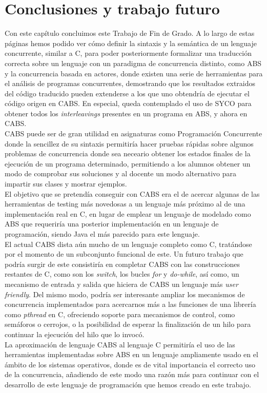 \chapter{Conclusiones y trabajo futuro}

Con este capítulo concluimos este Trabajo de Fin de Grado. A lo largo de estas páginas hemos podido ver cómo definir la sintaxis y la semántica de un lenguaje concurrente, similar a C, para poder posteriormente formalizar una traducción correcta sobre un lenguaje con un paradigma de concurrencia distinto, como ABS y la concurrencia basada en actores, donde existen una serie de herramientas para el análisis de programas concurrentes, demostrando que los resultados extraidos del código traducido pueden extenderse a los que uno obtendría de ejecutar el código origen en CABS. En especial, queda contemplado el uso de SYCO para obtener todos los \emph{interleavings} presentes en un programa en ABS, y ahora en CABS.\\

CABS puede ser de gran utilidad en asignaturas como Programación Concurrente donde la sencillez de su sintaxis permitiría hacer pruebas rápidas sobre algunos problemas de concurrencia donde sea neceario obtener los estados finales de la ejecución de un programa determinado, permitiendo a los alumnos obtener un modo de comprobar sus soluciones y al docente un modo alternativo para impartir sus clases y mostrar ejemplos.\\

El objetivo que se pretendía conseguir con CABS era el de acercar algunas de las herramientas de testing más novedosas a un lenguaje más próximo al de una implementación real en C, en lugar de emplear un lenguaje de modelado como ABS que requeriría una posterior implementación en un lenguaje de programación, siendo Java el más parecido para este lenguaje.\\

El actual CABS dista aún mucho de un lenguaje completo como C, tratándose por el momento de un subconjunto funcional de este. Un futuro trabajo que podría surgir de este consistiría en completar CABS con las construcciones restantes de C, como son los \emph{switch}, los bucles \emph{for} y \emph{do-while}, así como, un mecanismo de entrada y salida que hiciera de CABS un lenguaje más \emph{user friendly}. Del mismo modo, podría ser interesante ampliar los mecanismos de concurrencia implementados para acercarnos más a las funciones de una librería como \emph{pthread} en C, ofreciendo soporte para mecanismos de control, como semáforos o cerrojos, o la posibilidad de esperar la finalización de un hilo para continuar la ejecución del hilo que lo invocó.\\

La aproximación de lenguaje CABS al lenguaje C permitiría el uso de las herramientas implementadas sobre ABS en un lenguaje ampliamente usado en el ámbito de los sistemas operativos, donde es de vital importancia el correcto uso de la concurrencia, añadiendo de este modo una razón más para continuar con el desarrollo de este lenguaje de programación que hemos creado en este trabajo.
